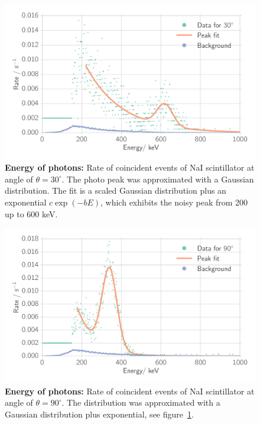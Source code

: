 \begin{figure}[htpb]
    \centering
    \includegraphics[width=0.9\linewidth]{./analysis/figures/coin_na_30}
    \caption{\textbf{Energy of photons:} Rate of coincident events of 
        NaI scintillator at angle of $\theta = 30^\circ$. The photo peak was approximated
    with a Gaussian distribution. The fit is a scaled Gaussian distribution plus an exponential $c \exp(-b E)$, which
    exhibits the noisy peak from 200 up to 600 keV.}
\label{fig:coin_na_30}
\end{figure}




\begin{figure}[htpb]
    \centering
    \includegraphics[width=0.9\linewidth]{./analysis/figures/coin_na_90}
\caption{\textbf{Energy of photons:} Rate of coincident events of 
        NaI scintillator at angle of $\theta = 90^\circ$. The distribution 
    was approximated with a Gaussian distribution plus exponential, see figure~\ref{fig:coin_na_30}. }
\label{fig:coin_na_90}
\end{figure}


